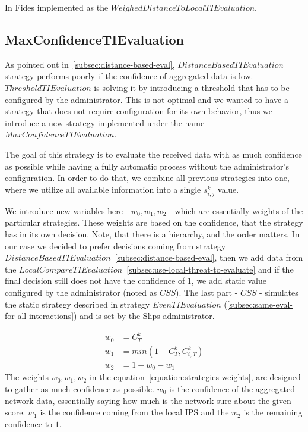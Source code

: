 \noindent
In Fides implemented as the $WeighedDistanceToLocalTIEvaluation$.

\subsection{MaxConfidenceTIEvaluation}
\label{subsec:MaxConfidenceTIEvaluation}
As pointed out in~\ref{subsec:distance-based-eval},  $DistanceBasedTIEvaluation$ strategy performs poorly if the confidence of aggregated data is low.
$ThresholdTIEvaluation$ is solving it by introducing a threshold that has to be configured by the administrator. This is not optimal and we wanted to have a strategy that does not require configuration for its own behavior, thus we introduce a new strategy implemented under the name $MaxConfidenceTIEvaluation$.

The goal of this strategy is to evaluate the received data with as much confidence as possible while having a fully automatic process without the administrator's configuration.
In order to do that, we combine all previous strategies into one, where we utilize all available information into a single $s^{k}_{i, j}$ value.

We introduce new variables here - $w_{0}, w_{1}, w_{2}$ - which are essentially weights of the particular strategies. These weights are based on the confidence, that the strategy has in its own decision.
Note, that there is a hierarchy, and the order matters. 
In our case we decided to prefer decisions coming from strategy $DistanceBasedTIEvaluation$~\ref{subsec:distance-based-eval}, then we add data from the $LocalCompareTIEvaluation$~\ref{subsec:use-local-threat-to-evaluate} and if the final decision still does not have the confidence of $1$, we add static value configured by the administrator (noted as $CSS$). 
The last part - $CSS$ - simulates the static strategy described in strategy $EvenTIEvaluation$ (\ref{subsec:same-eval-for-all-interactions}) and is set by the Slips administrator.

\begin{equation}
\label{equation:strategies-weights}
\begin{split}
    w_{0} &= {C}^{k}_{T} \\
    w_{1} &= min(1 - {C}^{k}_{T}, {C}^{k}_{i, T}) \\
    w_{2} &= 1 - w_{0} - w_{1}
\end{split}
\end{equation}
The weights $w_{0}, w_{1}, w_{2}$ in the equation~\ref{equation:strategies-weights}, are designed to gather as much confidence as possible. $w_{0}$ is the confidence of the aggregated network data, essentially saying how much is the network sure about the given score. 
$w_{1}$ is the confidence coming from the local IPS and the $w_{2}$ is the remaining confidence to $1$.

